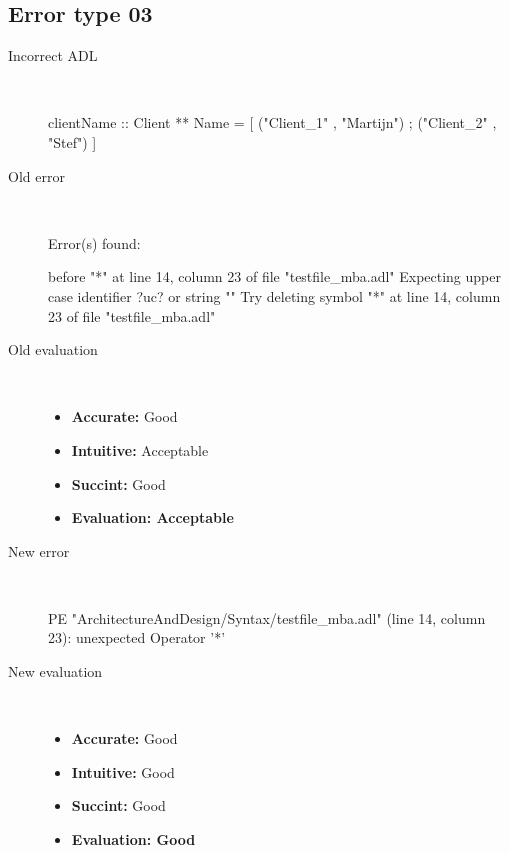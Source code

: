 \subsection{Error type 03}
  \begin{description}
  \item[Incorrect ADL]~\\
\begin{adl}
clientName :: Client ** Name =
    [ ("Client_1"      , "Martijn")
    ; ("Client_2"      , "Stef")
    ]\end{adl}
  \item[Old error]~\\
\begin{haskell}
Error(s) found:

before "*" at line 14, column 23 of file "testfile_mba.adl"
Expecting upper case identifier ?uc? or string ""
Try deleting symbol "*" at line 14, column 23 of file "testfile_mba.adl"\end{haskell}
  \item[Old evaluation]~\\
    \begin{itemize}
    \item \textbf{Accurate:} Good
    \item \textbf{Intuitive:} Acceptable
    \item \textbf{Succint:} Good
    \item \textbf{Evaluation: Acceptable}
    \end{itemize}
  \item[New error]~\\
\begin{haskell}
PE "ArchitectureAndDesign/Syntax/testfile_mba.adl" (line 14, column 23):
unexpected Operator '*'\end{haskell}
  \item[New evaluation]~\\
    \begin{itemize}
    \item \textbf{Accurate:} Good
    \item \textbf{Intuitive:} Good
    \item \textbf{Succint:} Good
    \item \textbf{Evaluation: Good
}
    \end{itemize}
  \end{description}

\hrulefill

